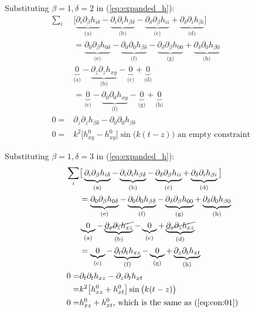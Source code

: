 \documentclass[]{article}
\begin{document}
Substituting $\beta=1,\delta=2$ in (\ref{eq:expanded_h}):
\begin{align*}
	\sum_i&\big[\underbrace{\partial_i\partial_\beta h_{i\delta}}_\text{(a)} - \underbrace{\partial_i\partial_i h_{\beta\delta}}_\text{(b)} -  \underbrace{\partial_\delta\partial_\beta h_{ii}}_\text{(c)} + \underbrace{\partial_\delta\partial_i h_{\beta i}}_\text{(d)}\big]\\
	&=\underbrace{\partial_0\partial_\beta h_{0\delta}}_\text{(e)} - \underbrace{\partial_0\partial_0 h_{\beta\delta}}_\text{(f)} -  \underbrace{\partial_\delta\partial_\beta h_{00}}_\text{(g)} + \underbrace{\partial_\delta\partial_0 h_{\beta 0}}_\text{(h)}\\
	&\underbrace{0}_\text{(a)} - \underbrace{\partial_z\partial_z h_{xy}}_\text{(b)} -  \underbrace{0}_\text{(c)} + \underbrace{0}_\text{(d)}\\
	&=\underbrace{0}_\text{(e)} - \underbrace{\partial_0\partial_0 h_{xy}}_\text{(f)} -  \underbrace{0}_\text{(g)} + \underbrace{0}_\text{(h)}\\
	0=& \partial_z\partial_z h_{\beta\delta} -\partial_0\partial_0 h_{\beta\delta}\\
	0=&k^2 \big[h^0_{xy}-h^0_{xy}\big] \sin\big(k(t-z)\big) \text{ an empty constraint }
\end{align*}

Substituting $\beta=1,\delta=3$ in (\ref{eq:expanded_h}):
\begin{align*}
	\sum_i&\big[\underbrace{\partial_i\partial_\beta h_{i\delta}}_\text{(a)} - \underbrace{\partial_i\partial_i h_{\beta\delta}}_\text{(b)} -  \underbrace{\partial_\delta\partial_\beta h_{ii}}_\text{(c)} + \underbrace{\partial_\delta\partial_i h_{\beta i}}_\text{(d)}\big]\\
	&=\underbrace{\partial_0\partial_\beta h_{0\delta}}_\text{(e)} - \underbrace{\partial_0\partial_0 h_{\beta\delta}}_\text{(f)} -  \underbrace{\partial_\delta\partial_\beta h_{00}}_\text{(g)} + \underbrace{\partial_\delta\partial_0 h_{\beta 0}}_\text{(h)}\\
	&\underbrace{0}_\text{(a)} - \underbrace{\cancel{\partial_z\partial_z h_{xz}}}_\text{(b)} -  \underbrace{0}_\text{(c)} + \underbrace{\cancel{\partial_z\partial_z h_{x z}}}_\text{(d)}\\
	&=\underbrace{0}_\text{(e)} - \underbrace{\partial_t\partial_t h_{xz}}_\text{(f)} -  \underbrace{0}_\text{(g)} + \underbrace{\partial_z\partial_t h_{xt}}_\text{(h)}\\
	0=&\partial_t\partial_t h_{xz}-\partial_z\partial_t h_{xt}\\
	=&k^2 \big[h^0_{xz}+h^0_{xt}\big] \sin\big(k(t-z)\big)\\
	0=&h^0_{xz}+h^0_{xt} \text{, which is the same as (\ref{eq:con:01})}
\end{align*}
\end{document}
